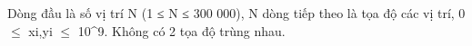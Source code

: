 Dòng đầu là số vị trí N (1 ≤ N ≤ 300 000), N dòng tiếp theo là tọa độ các vị trí, 0  $\le$ xi,yi $\le$ 10^9. Không có 2 tọa độ trùng nhau.